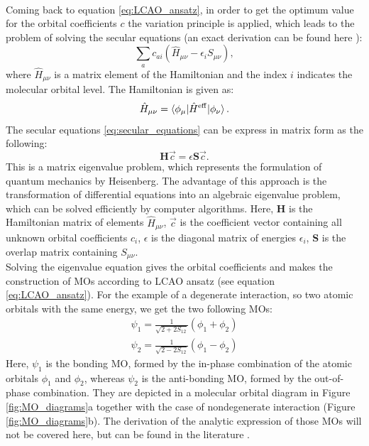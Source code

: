\\Coming back to equation \ref{eq:LCAO_ansatz}, in order to get the optimum value for the orbital coefficients $c$ the variation principle is applied, which leads to the problem of solving the secular equations (an exact derivation can be found here \cite{albright2013orbital}):
\begin{equation}
    \sum_{a} c_{ai}\left(\hat{H}_{\mu\nu}-\epsilon_{i}S_{\mu\nu}\right), 
    \label{eq:secular_equations}
\end{equation}
where $\hat{H}_{\mu\nu}$ is a matrix element of the Hamiltonian and the index $i$ indicates the molecular orbital level. The Hamiltonian is given as:
\begin{equation}
    \hat{H}_{\mu\nu} = \braket{\phi_{\mu}|\hat{H}^{\mathrm{eff}}|\phi_{\nu}}.
    \label{eq:hamiltonina_matrix_element}
\end{equation}
The secular equations \ref{eq:secular_equations} can be express in matrix form as the following:
\begin{equation}
    \textbf{H} \vec{c} = \epsilon \textbf{S}\vec{c}.
    \label{eq:matrix_eigenvalue_problem}
\end{equation}
This is a matrix eigenvalue problem, which represents the formulation of quantum mechanics by Heisenberg. The advantage of this approach is the transformation of differential equations into an algebraic eigenvalue problem, which can be solved efficiently by computer algorithms. Here, \textbf{H} is the Hamiltonian matrix of elements $\hat{H}_{\mu\nu}$, $\vec{c}$ is the coefficient vector containing all unknown orbital coefficients $c_{i}$, $\epsilon$ is the diagonal matrix of energies $\epsilon_{i}$, \textbf{S} is the overlap matrix containing $S_{\mu\nu}$. \\
Solving the eigenvalue equation gives the orbital coefficients and makes the construction of MOs according to LCAO ansatz (see equation \ref{eq:LCAO_ansatz}). For the example of a degenerate interaction, so two atomic orbitals with the same energy, we get the two following MOs:
\begin{align}
    \psi_{1} = \frac{1}{\sqrt{2+2S_{12}}}\left(\phi_{1}+\phi_{2}\right) \\
    \psi_{2} = \frac{1}{\sqrt{2-2S_{12}}}\left(\phi_{1}-\phi_{2}\right)
    \label{eq:MOs_degenerate_interaction}
\end{align}
Here, $\psi_{1}$ is the bonding MO, formed by the in-phase combination of the atomic orbitals $\phi_{1}$ and $\phi_{2}$, whereas $\psi_{2}$ is the anti-bonding MO, formed by the out-of-phase combination. They are depicted in a molecular orbital diagram in Figure \ref{fig:MO_diagrams}a together with the case of nondegenerate interaction (Figure \ref{fig:MO_diagrams}b). The derivation of the analytic expression of those MOs will not be covered here, but can be found in the literature \cite{albright2013orbital}.
